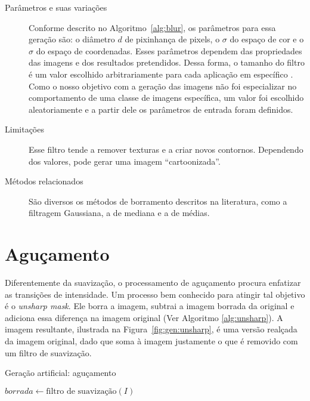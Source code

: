 \begin{description}
  \item[Parâmetros e suas variações] Conforme descrito no Algoritmo~\ref{alg:blur}, os parâmetros para essa geração são: o diâmetro $d$ de pixinhança de pixels, o $\sigma$ do espaço de cor e o $\sigma$ do espaço de coordenadas. Esses parâmetros dependem das propriedades das imagens e dos resultados pretendidos. Dessa forma, o tamanho do filtro é um valor escolhido arbitrariamente para cada aplicação em específico \cite{Tomasi1998}. Como o nosso objetivo com a geração das imagens não foi especializar no comportamento de uma classe de imagens específica, um valor foi escolhido aleatoriamente e a partir dele os parâmetros de entrada foram definidos.

  \item[Limitações] Esse filtro tende a remover texturas e a criar novos contornos. Dependendo dos valores, pode gerar uma imagem ``cartoonizada''.

  \item[Métodos relacionados] São diversos os métodos de borramento descritos na literatura, como a filtragem Gaussiana, a de mediana e a de médias.


\end{description}
\section{Aguçamento}

Diferentemente da suavização, o processamento de aguçamento procura enfatizar as transições de intensidade. Um processo bem conhecido para atingir tal objetivo é o \textit{unsharp mask}. Ele borra a imagem, subtrai a imagem borrada da original e adiciona essa diferença na imagem original (Ver Algoritmo \ref{alg:unsharp}). A imagem resultante, ilustrada na Figura~\ref{fig:gen:unsharp}, é uma versão realçada da imagem original, dado que soma à imagem justamente o que é removido com um filtro de suavização.

\vspace{0.5cm}
\begin{algorithm}[!htbp]
  \caption{Geração artificial: aguçamento}
  \label{alg:unsharp}
  \SetAlgoLined
  $borrada \gets \text{filtro de suavização}(I)$
\end{algorithm}
\vspace{0.5cm}

